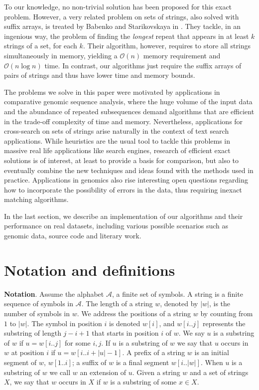 \documentclass[submission]{dmtcs}
\newcommand{\Ode}{{\mathcal O}}
\newcommand\+[1]{\mathcal{#1}}
\begin{document}
To our knowledge, no non-trivial solution has been proposed for this exact
problem. However, a very related problem on sets of strings, also solved with 
suffix arrays, is treated by Babenko and  Starikovskaya in \cite{babenko}.
They tackle, in an ingenious way, the problem of
finding the {\em longest} repeat that appears in at least $k$ 
strings of a set, for each $k$.
Their algorithm, however, requires to store all strings simultaneously in
memory, yielding a $\Ode(n)$ memory requirement and $\Ode(n \log n)$ time. 
In contrast, our algorithms just require the suffix arrays of pairs of
strings and thus have lower time and memory bounds.

The problems we solve in this paper were motivated by applications in 
comparative genomic sequence analysis, where the huge 
volume of the input data and the abundance of repeated 
subsequences demand algorithms that are 
efficient in the trade-off complexity of time and memory. Nevertheless,
applications for cross-search on sets of strings arise naturally in the
context of text search applications.
While heuristics are the usual tool to tackle this
problems in massive real life applications like search engines, research of
efficient exact solutions is of interest, at least to provide a basis
for comparison, but also to eventually combine the new techniques and ideas
found with the methods used in practice. Applications in genomics also rise
interesting open questions regarding how to incorporate the possibility of
errors in the data, thus requiring inexact matching algorithms.

In the last section, we describe an implementation of our 
algorithms and their performance on real datasets,
including various possible scenarios such as genomic data, 
source code and literary work.

\section{Notation and definitions}

\noindent
{\bf Notation}. Assume the alphabet $\+A$, a finite set of symbols.
A string is a finite sequence of symbols in $\+A$.
The length of a string $w$, denoted by $|w|$, 
is the number of symbols in $w$.
We address the positions of a string $w$ 
by counting from $1$ to $|w|$.
The symbol in position $i$ is denoted $w[i]$, 
and $w[i..j]$ represents the
substring of length $j-i+1$ that starts in position $i$ of $w$.
We say $u$ is a substring of $w$ if $u = w[i..j]$ for some $i,j$.
If $u$ is a substring of $w$ we say that $u$ occurs in $w$ 
at position $i$ if $u=w[i.. i+|u|-1]$.
A prefix of a string $w$ is an initial segment of $w$, $w[1..i]$;
a suffix of  $w$ is a final segment  $w[i..|w|]$.
When $u$ is a substring of $w$ we call $w$ an extension of $u$.
Given a string $w$ and a set of strings $X$, we say that $w$ occurs in $X$
if $w$ is a substring of some $x \in X$.
\end{document}

